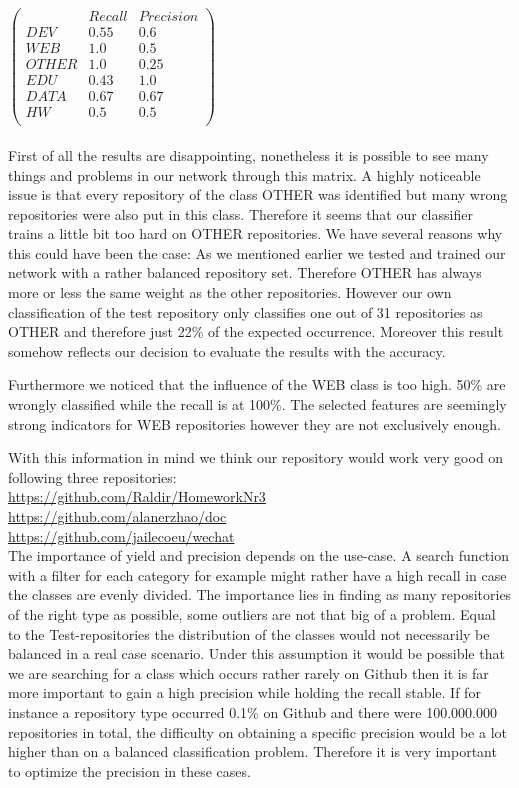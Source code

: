 \documentclass[paper=A4,pagesize=auto,12pt,headinclude=true,footinclude=true,BCOR=0mm,DIV=calc]{scrartcl}
\begin{document}
		$\begin{pmatrix}
		    & Recall & Precision \\
		   \hline
		DEV & 0.55 & 0.6\\
		 WEB& 1.0 & 0.5 \\
		 OTHER& 1.0 & 0.25 \\
		 ED U& 0.43 & 1.0 \\
		  DATA & 0.67 & 0.67 \\
		  HW& 0.5 & 0.5 \\
		\end{pmatrix}$
	\\
	\\
	First of all the results are disappointing, nonetheless it is possible to see many things and problems in our network through this matrix. A highly noticeable issue is that every repository of the class OTHER was identified but many wrong repositories were also put in this class. Therefore it seems that our classifier trains a little bit too hard on OTHER repositories. We have several reasons why this could have been the case: As we mentioned earlier we tested and trained our network with a rather balanced repository set. Therefore OTHER has always more or less the same weight as the other repositories. However our own classification of the test repository only classifies one out of 31 repositories as OTHER and therefore just 22\% of the expected occurrence. Moreover this result somehow reflects our decision to evaluate the results with the accuracy.\cite{EvaluateNetwork}
	
	
	Furthermore we noticed that the influence of the WEB class is too high. 50\% are wrongly classified while the recall is at 100\%. The selected features are seemingly strong indicators for WEB repositories however they are not exclusively enough.
	
	
	With this information in mind we think our repository would work very good on following three repositories:\\
	\url{https://github.com/Raldir/HomeworkNr3}\\
	\url{https://github.com/alanerzhao/doc}\\
	\url{https://github.com/jailecoeu/wechat}\\
	
	
	 The importance of yield and precision depends on the use-case. A search function with a filter for each category for example might rather have a high recall in case the classes are evenly divided. The importance lies in finding as many repositories of the right type as possible, some outliers are not that big of a problem. Equal to the Test-repositories the distribution of the classes would not necessarily be balanced in a real case scenario. Under this assumption it would be possible that we are searching for a class which occurs rather rarely on Github then it is far more important to gain a high precision while holding the recall stable. If for instance a repository type occurred 0.1\% on Github and there were 100.000.000 repositories in total, the difficulty on obtaining a specific precision would be a lot higher than on a balanced classification problem. Therefore it is very important to optimize the precision in these cases.
	
\end{document}
